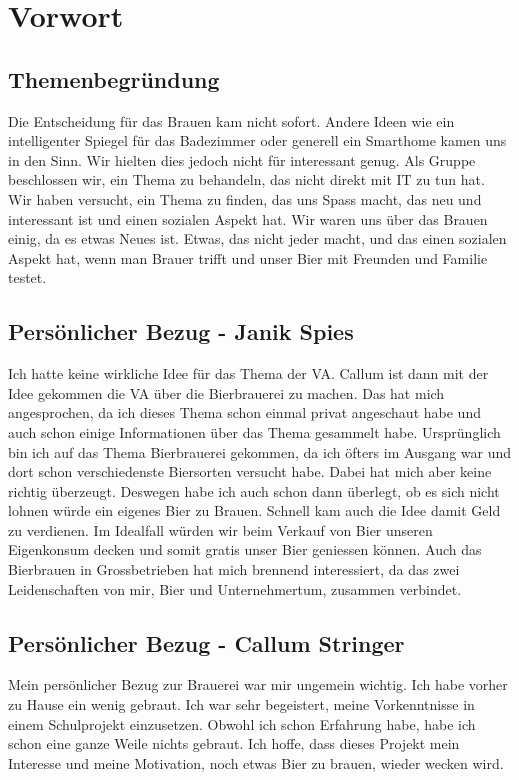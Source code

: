 \newpage
\section{Vorwort}
\subsection{Themenbegründung}
Die Entscheidung für das Brauen kam nicht sofort. Andere Ideen
 wie ein intelligenter Spiegel für das Badezimmer oder generell 
 ein Smarthome kamen uns in den Sinn. Wir hielten dies jedoch nicht
  für interessant genug. Als Gruppe beschlossen wir, ein Thema zu behandeln, das nicht direkt mit IT zu tun hat. Wir haben versucht, 
   ein Thema zu finden, das uns Spass macht, das neu und interessant ist und einen sozialen Aspekt hat.
Wir waren uns über das Brauen einig,
 da es etwas Neues ist. Etwas, das nicht jeder macht, 
 und das einen sozialen Aspekt hat, wenn man Brauer trifft und unser Bier mit Freunden und Familie testet.
 \subsection{Persönlicher Bezug - Janik Spies}
 Ich hatte keine wirkliche Idee für das Thema der VA. Callum ist dann mit der Idee gekommen die VA über die Bierbrauerei zu machen. Das hat mich angesprochen, da ich dieses Thema schon einmal privat angeschaut habe und auch schon einige Informationen über das Thema gesammelt habe. Ursprünglich bin ich auf das Thema Bierbrauerei gekommen, da ich öfters im Ausgang war und dort schon verschiedenste Biersorten versucht habe. Dabei hat mich aber keine richtig überzeugt. Deswegen habe ich auch schon dann überlegt, ob es sich nicht lohnen würde ein eigenes Bier zu Brauen. Schnell kam auch die Idee damit Geld zu verdienen. Im Idealfall würden wir beim Verkauf von Bier unseren Eigenkonsum decken und somit gratis unser Bier geniessen können. Auch das Bierbrauen in Grossbetrieben hat mich brennend interessiert, 
 da das zwei Leidenschaften von mir, Bier und Unternehmertum, zusammen verbindet.
\subsection{Persönlicher Bezug - Callum Stringer}
Mein persönlicher Bezug zur Brauerei war mir ungemein wichtig. Ich habe vorher zu Hause ein wenig gebraut. 
Ich war sehr begeistert, meine Vorkenntnisse in einem Schulprojekt einzusetzen. Obwohl ich schon Erfahrung habe, habe ich schon eine ganze Weile nichts gebraut.
 Ich hoffe, dass dieses Projekt mein Interesse und meine Motivation, noch etwas Bier zu brauen, wieder wecken wird.
